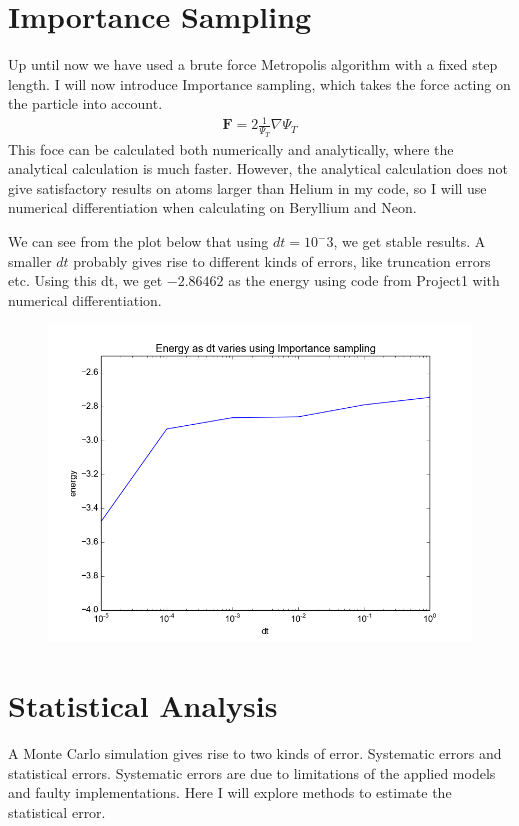 \documentclass[a4paper, 12pt, titlepage]{article}
\begin{document}
\section*{Importance Sampling}
 Up until now we have used a brute force Metropolis algorithm with a fixed step length. I will now introduce Importance sampling, which takes the force acting on the particle into account.
 \begin{align*}
 	\mathbf{F} = 2 \frac{1}{\Psi_T} \nabla \Psi_T	
 \end{align*}
 This foce can be calculated both numerically and analytically, where the analytical calculation is much faster. However, the analytical calculation does not give satisfactory results on atoms larger than Helium in my code, so I will use numerical differentiation when calculating on Beryllium and Neon. 

 We can see from the plot below that using $dt = 10^-3$, we get stable results. A smaller $dt$ probably gives rise to different kinds of errors, like truncation errors etc. Using this dt, we get $-2.86462$ as the energy using code from Project1 with numerical differentiation. 
 \begin{figure}[H] 
 	\centering
 	\includegraphics[width=\textwidth]{../python_programs/ImportanceSampling_Helium_dt.png}
 \end{figure}

\section*{Statistical Analysis}
 A Monte Carlo simulation gives rise to two kinds of error. Systematic errors and statistical errors. Systematic errors are due to limitations of the applied models and faulty implementations. Here I will explore methods to estimate the statistical error. 
\end{document}
